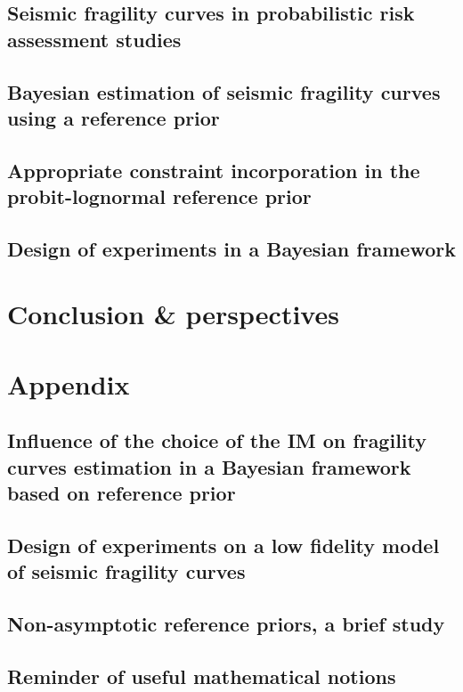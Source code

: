 \documentclass[a4paper]{book}
\begin{document}
\chapter{Seismic fragility curves in probabilistic risk assessment studies}\label{chap:frags-intro}




\chapter{Bayesian estimation of seismic fragility curves using a reference prior}\label{chap:prem}




\chapter{Appropriate constraint incorporation in the probit-lognormal reference prior}\label{chap:constrained-frags}




\chapter{Design of experiments in a Bayesian framework}\label{chap:doe}






\part{Conclusion \& perspectives}\label{part:conclusion}


\appendix
\part*{Appendix}\label{part:appendix}


\chapter{Influence of the choice of the IM on fragility curves estimation in a Bayesian framework based on reference prior}\label{app:chap:uncecomp}

\chapter{Design of experiments on a low fidelity model of seismic fragility curves}\label{app:chap:ESAIM}




\chapter{Non-asymptotic reference priors, a brief study}



\chapter{Reminder of useful mathematical notions}

 
\printbibliography 
{}
\end{document}
